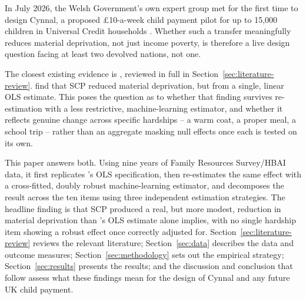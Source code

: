 In July 2026, the Welsh Government's own expert group met for the first time to design Cynnal, a proposed \pounds10-a-week child payment pilot for up to 15,000 children in Universal Credit households \citep{welshgovernment2026}. Whether such a transfer meaningfully reduces material deprivation, not just income poverty, is therefore a live design question facing at least two devolved nations, not one.

The closest existing evidence is \citet{andersen2025}, reviewed in full in Section~\ref{sec:literature-review}. \citeauthor{andersen2025} find that SCP reduced material deprivation, but from a single, linear OLS estimate. This poses the question as to whether that finding survives re-estimation with a less restrictive, machine-learning estimator, and whether it reflects genuine change across specific hardships -- a warm coat, a proper meal, a school trip -- rather than an aggregate masking null effects once each is tested on its own. 

This paper answers both. Using nine years of Family Resources Survey/HBAI data, it first replicates \citet{andersen2025}'s OLS specification, then re-estimates the same effect with a cross-fitted, doubly robust machine-learning estimator, and decomposes the result across the ten items using three independent estimation strategies. The headline finding is that SCP produced a real, but more modest, reduction in material deprivation than \citeauthor{andersen2025}'s OLS estimate alone implies, with no single hardship item showing a robust effect once correctly adjusted for. Section~\ref{sec:literature-review} reviews the relevant literature; Section~\ref{sec:data} describes the data and outcome measures; Section~\ref{sec:methodology} sets out the empirical strategy; Section~\ref{sec:results} presents the results; and the discussion and conclusion that follow assess what these findings mean for the design of Cynnal and any future UK child payment.
